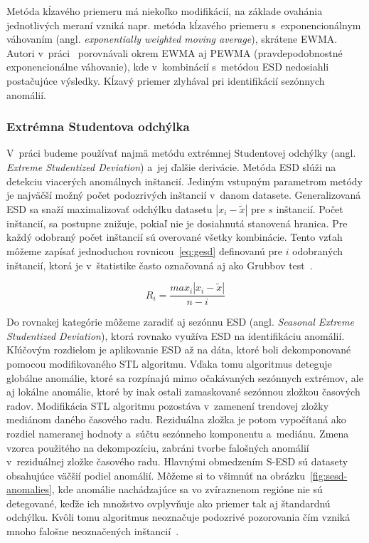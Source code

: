 \documentclass[a4paper,twoside,slovak,12pt,appendix]{article}
\begin{document}
Metóda kĺzavého priemeru má niekoľko modifikácií, na základe ovahánia
jednotlivých meraní vzniká napr. metóda kĺzavého priemeru s~exponencionálnym
váhovaním (angl. \textit{exponentially weighted moving average}), skrátene
EWMA. Autori v~práci~\cite{Hochenbaum2017} porovnávali okrem EWMA aj PEWMA
(pravdepodobnostné exponencionálne váhovanie), kde v~kombinácií s~metódou ESD
nedosiahli postačujúce výsledky. Kĺzavý priemer zlyhával pri identifikácií
sezónnych anomálií.


\subsubsection{Extrémna Studentova odchýlka}
\label{c:esd}
V~práci budeme používať najmä metódu extrémnej Studentovej odchýlky (angl.
\textit{Extreme Studentized Deviation}) a~jej ďalšie derivácie. Metóda
ESD slúži na detekciu viacerých anomálnych inštancií. Jediným vstupným
parametrom metódy je najväčší možný počet podozrivých inštancií v~danom
datasete. Generalizovaná ESD sa snaží maximalizovať odchýlku datasetu
$|x_i - \tilde{x}|$ pre $s$ inštancií. Počet inštancií, sa postupne znižuje,
pokiaľ nie je dosiahnutá stanovená hranica. Pre každý odobraný počet inštancií
sú overované všetky kombinácie. Tento vzťah môžeme zapísať jednoduchou
rovnicou~\ref{eq:gesd} definovanú pre $i$ odobraných inštancií, ktorá je
v~štatistike často označovaná aj ako Grubbov test~\cite{Kuppusamy2013,Rosner1983}.

\begin{equation}
	\label{eq:gesd}
  R_i = \frac
  {max_i |x_i - \tilde{x}|}
  {n - i}
\end{equation}

Do rovnakej kategórie môžeme zaradiť aj sezónnu ESD (angl. \textit{Seasonal
Extreme Studentized Deviation}), ktorá rovnako využíva ESD na identifikáciu
anomálií. Kľúčovým rozdielom je aplikovanie ESD až na dáta, ktoré boli
dekomponované pomocou modifikovaného STL algoritmu. Vďaka tomu algoritmus
deteguje globálne anomálie, ktoré sa rozpínajú mimo očakávaných sezónnych
extrémov, ale aj lokálne anomálie, ktoré by inak ostali zamaskované sezónnou
zložkou časových radov. Modifikácia STL algoritmu pozostáva v~zamenení trendovej
zložky mediánom daného časového radu. Reziduálna zložka je potom vypočítaná ako
rozdiel nameranej hodnoty a~súčtu sezónneho komponentu a~mediánu. Zmena vzorca
použitého na dekompozíciu, zabráni tvorbe falošných anomálií v~reziduálnej
zložke časového radu. Hlavnými obmedzením S-ESD sú datasety obsahujúce
väčšií podiel anomálií. Môžeme si to všimnúť na
obrázku~\ref{fig:sesd-anomalies}, kde anomálie nachádzajúce sa vo zvíraznenom
regióne nie sú detegované, keďže ich množstvo ovplyvňuje ako priemer tak aj
štandardnú odchýlku. Kvôli tomu algoritmus neoznačuje podozrivé pozorovania čím
vzniká mnoho falošne neoznačených inštancií~\cite{Hochenbaum2017}.
\end{document}
